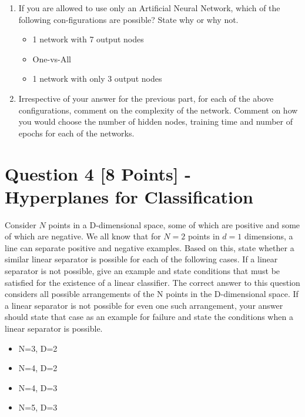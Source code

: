 \documentclass[fontsize=10pt,DIV=14]{scrartcl}
\begin{document}
	\begin{enumerate}
		\item
		If you are allowed to use only an Artiﬁcial Neural Network, which of the following con-ﬁgurations are possible? State why or why not.
		\begin{itemize}
			\item
			1 network with 7 output nodes

			\item
			One-vs-All

			\item
			1 network with only 3 output nodes
		\end{itemize}

		\item
		Irrespective of your answer for the previous part, for each of the above conﬁgurations, comment on the complexity of the network. Comment on how you would choose the number of hidden nodes, training time and number of epochs for each of the networks.

	\end{enumerate}

	\section{Question 4 [8 Points] - Hyperplanes for Classiﬁcation}

	Consider $N$ points in a D-dimensional space, some of which are positive and some of which are negative. We all know that for $N = 2$ points in $d = 1$ dimensions, a line can separate positive and negative examples. Based on this, state whether a similar linear separator is possible for each of the following cases. If a linear separator is not possible, give an example and state conditions that must be satisﬁed for the existence of a linear classiﬁer. The correct answer to this question considers all possible arrangements of the N points in the D-dimensional space. If a linear separator is not possible for even one such arrangement, your answer should state that case as an example for failure and state the conditions when a linear separator is possible.
	\begin{itemize}
		\item
		N=3, D=2

		\item
		N=4, D=2

		\item
		N=4, D=3

		\item
		N=5, D=3
	\end{itemize}
\end{document}

